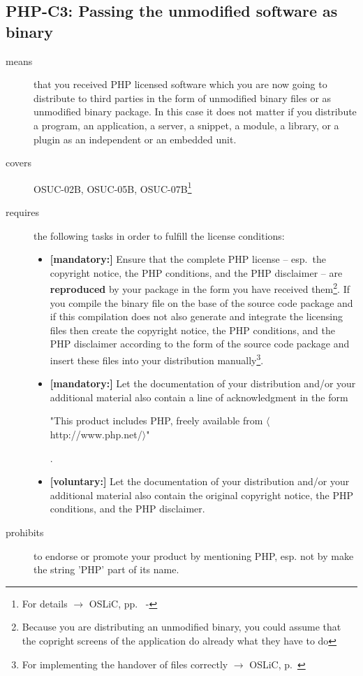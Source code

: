 \subsection{PHP-C3: Passing the unmodified software as binary}
\label{OSUC-02B-PHP} \label{OSUC-05B-PHP} \label{OSUC-07B-PHP} 

\begin{description}

\item[means] that you received PHP licensed software which you are now
  going to distribute to third parties in the form of unmodified binary files or
  as unmodified binary package. In this case it does not matter if you distribute
  a program, an application, a server, a snippet, a module, a library, or a
  plugin as an independent or an embedded unit.

\item[covers] OSUC-02B, OSUC-05B, OSUC-07B\footnote{For details $\rightarrow$
OSLiC, pp.\ \pageref{OSUC-02B-DEF} - \pageref{OSUC-07B-DEF}}

\item[requires] the following tasks in order to fulfill the license conditions:
\begin{itemize}

  \item \textbf{[mandatory:]} Ensure that the complete PHP license -- esp.\ the
  copyright notice, the PHP conditions, and the PHP disclaimer -- are
  \textbf{reproduced} by your package in the form you have received
  them\footnote{Because you are distributing an unmodified binary, you could
  assume that the copright screens of the application do already what they have
  to do}. If you compile the binary file on the base of the source code package
  and if this compilation does not also generate and integrate the licensing
  files then create the copyright notice, the PHP conditions, and the PHP
  disclaimer according to the form of the source code package and insert these
  files into your distribution manually\footnote{For implementing the handover
  of files correctly $\rightarrow$ OSLiC, p.\ \pageref{DistributingFilesHint}}.
  
  \item \textbf{[mandatory:]} Let the documentation of your distribution and/or
  your additional material also contain a line of acknowledgment in the form
   \begin{footnotesize}"This product includes PHP, freely available from
  $\langle$http://www.php.net/$\rangle$"\end{footnotesize}.
    
  \item \textbf{[voluntary:]} Let the documentation of your distribution and/or
  your additional material also contain the original copyright notice, the PHP
  conditions, and the PHP disclaimer.

\end{itemize}

\item[prohibits] to endorse or promote your product by mentioning PHP, esp. not
by make the string 'PHP' part of its name.

\end{description}

